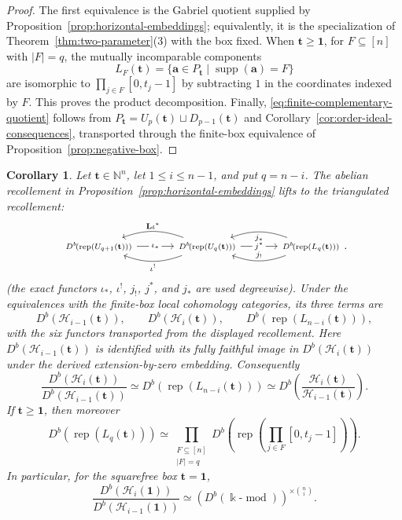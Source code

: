 \documentclass[10pt,a4paper]{amsart}
\newtheorem{corollary}[theorem]{Corollary}
\newcommand{\Rep}{\operatorname{rep}}
\newcommand{\modcat}{\operatorname{mod}}
\begin{document}
\begin{proof}
The first equivalence is the Gabriel quotient supplied by
Proposition~\ref{prop:horizontal-embeddings}; equivalently, it is the
specialization of Theorem~\ref{thm:two-parameter}(3) with the box fixed.
When $\mathbf t\ge\mathbf1$, for $F\subseteq[n]$ with $|F|=q$, the mutually incomparable
components
\[
L_F(\mathbf t)=\{\mathbf a\in P_{\mathbf t}\mid
\operatorname{supp}(\mathbf a)=F\}
\]
are isomorphic to $\prod_{j\in F}[0,t_j-1]$ by subtracting $1$ in the
coordinates indexed by $F$.  This proves the product decomposition.  Finally,
\eqref{eq:finite-complementary-quotient} follows from
$P_{\mathbf t}=U_p(\mathbf t)\sqcup D_{p-1}(\mathbf t)$ and
Corollary~\ref{cor:order-ideal-consequences}, transported through the
finite-box equivalence of Proposition~\ref{prop:negative-box}.
\end{proof}

\begin{corollary}\label{cor:derived-horizontal-recollement}
Let $\mathbf t\in\mathbb N^n$, let $1\le i\le n-1$, and put $q=n-i$.
The abelian recollement in Proposition~\ref{prop:horizontal-embeddings} lifts
to the triangulated recollement:
\[
\begin{tikzcd}[column sep=3.4em]
{\scriptstyle D^b\!\left(\Rep(U_{q+1}(\mathbf t))\right)}
  \arrow[r, "{\scriptstyle \iota_*}" description]
& {\scriptstyle D^b\!\left(\Rep(U_q(\mathbf t))\right)}
  \arrow[l, bend right=20, "{\scriptstyle \mathbf L\iota^*}"']
  \arrow[l, bend left=20, "{\scriptstyle \iota^!}"]
  \arrow[r, "{\scriptstyle j^*}" description]
& {\scriptstyle D^b\!\left(\Rep(L_q(\mathbf t))\right)}
  \arrow[l, bend left=20, "{\scriptstyle j_!}"']
  \arrow[l, bend right=20, "{\scriptstyle j_*}"]
\end{tikzcd}.
\]
(the exact functors $\iota_*$, $\iota^!$, $j_!$, $j^*$, and $j_*$ are used degreewise).  Under the equivalences with the finite-box local cohomology categories, its three terms are
\[
D^b\!\left(\mathcal H_{i-1}(\mathbf t)\right),
\qquad
D^b\!\left(\mathcal H_i(\mathbf t)\right),
\qquad
D^b\!\left(\Rep(L_{n-i}(\mathbf t))\right),
\]
with the six functors transported from the displayed recollement.
Here $D^b(\mathcal H_{i-1}(\mathbf t))$ is identified with its fully faithful
image in $D^b(\mathcal H_i(\mathbf t))$ under the derived extension-by-zero
embedding.  Consequently
\[
\frac{D^b(\mathcal H_i(\mathbf t))}
     {D^b(\mathcal H_{i-1}(\mathbf t))}
\simeq
D^b\!\left(\Rep(L_{n-i}(\mathbf t))\right)
\simeq
D^b\!\left(
\frac{\mathcal H_i(\mathbf t)}{\mathcal H_{i-1}(\mathbf t)}
\right).
\]
If $\mathbf t\ge\mathbf1$, then moreover
\[
D^b\!\left(\Rep(L_q(\mathbf t))\right)
\simeq
\prod_{\substack{F\subseteq[n]\\|F|=q}}
D^b\!\left(\Rep\!\left(\prod_{j\in F}[0,t_j-1]\right)\right).
\]
In particular, for the squarefree box $\mathbf t=\mathbf1$,
\[
\frac{D^b(\mathcal H_i(\mathbf1))}
     {D^b(\mathcal H_{i-1}(\mathbf1))}
\simeq
\left(D^b(\Bbbk\text{-}\modcat)\right)^{\times\binom{n}{i}}.
\]
\end{corollary}
\end{document}

